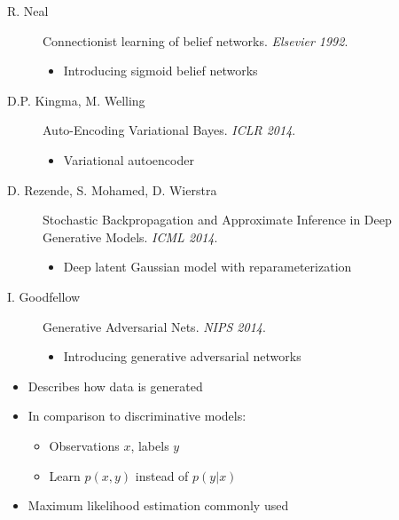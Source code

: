 \documentclass[11pt, a4paper, landscape]{article}
\begin{document}
\NewPage{}
\vfill
\begin{description}
	\item [R. Neal] Connectionist learning of belief networks. {\em Elsevier 1992}.
	\begin{itemize}
		\item Introducing sigmoid belief networks
	\end{itemize}
	\item [D.P. Kingma, M. Welling] Auto-Encoding Variational Bayes. {\em ICLR 2014}.
	\begin{itemize}
		\item Variational autoencoder
	\end{itemize}
	\item [D. Rezende, S. Mohamed, D. Wierstra] Stochastic Backpropagation and Approximate Inference in Deep Generative Models. {\em ICML 2014}.
	\begin{itemize}
		\item Deep latent Gaussian model with reparameterization
	\end{itemize}
	\item [I. Goodfellow] Generative Adversarial Nets. {\em NIPS 2014}.
	\begin{itemize}
		\item Introducing generative adversarial networks
	\end{itemize}
\end{description}
\vfill

\NewPage{}
\vfill
\begin{itemize}
  \item Describes how data is generated
  \item In comparison to discriminative models:
  \begin{itemize}
    \item Observations $x$, labels $y$
    \item Learn $p(x,y)$ instead of $p(y|x)$
  \end{itemize}
  \item Maximum likelihood estimation commonly used
\end{itemize}
\vfill
\end{document}
